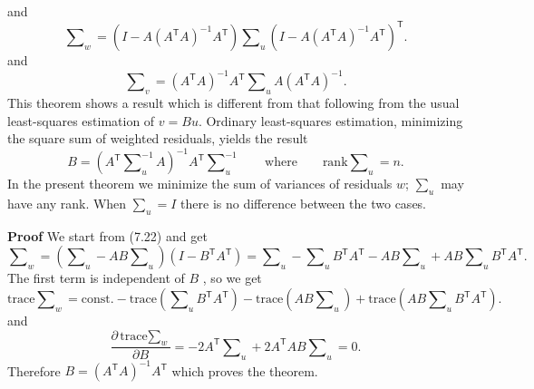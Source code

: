 and
\begin{equation}
\sum\nolimits_w
=(I - A(A^\mathsf{T}A)^{-1}A^\mathsf{T})\sum\nolimits_u(I - A(A^\mathsf{T}A)^{-1}A^\mathsf{T})^\mathsf{T}.
\end{equation}
and
\begin{equation}
\sum\nolimits_v
=(A^\mathsf{T}A)^{-1}A^\mathsf{T}\sum\nolimits_uA(A^\mathsf{T}A)^{-1}.
\end{equation}
This theorem shows a result which is different from that following from the usual
least-squares estimation of $v = Bu$. Ordinary least-squares estimation, minimizing the
square sum of weighted residuals, yields the result
\begin{equation*}
B = (A^\mathsf{T}\sum\nolimits_{u}^{-1}A)^{-1}A^\mathsf{T}\sum\nolimits_{u}^{-1} \qquad \text{where} \qquad \text{rank} \sum\nolimits_u = n.
\end{equation*}
In the present theorem we minimize the sum of variances of residuals $w$; $\sum_u$ may have any
rank. When $\sum_u = I$ there is no difference between the two cases.
\par\noindent
\textbf{Proof} We start from (7.22) and get
\begin{equation*}
\sum\nolimits_w = (\sum\nolimits_u - AB\sum\nolimits_u)(I - B^\mathsf{T}A^\mathsf{T})
= \sum\nolimits_u - \sum\nolimits_uB^\mathsf{T}A^\mathsf{T} - AB\sum\nolimits_u + AB\sum\nolimits_uB^\mathsf{T}A^\mathsf{T}.
\end{equation*}
The first term is independent of $B$ , so we get
\begin{equation*}
\text{trace} \sum\nolimits_w = \text{const}.
- \text{trace}(\sum\nolimits_uB^\mathsf{T}A^\mathsf{T})
- \text{trace}(AB\sum\nolimits_u)
+ \text{trace}(AB\sum\nolimits_uB^\mathsf{T}A^\mathsf{T}).
\end{equation*}
and
\begin{equation*}
\frac{\partial {\text{trace} \sum\nolimits_w}}{\partial{B}}
= -2A^\mathsf{T}\sum\nolimits_u + 2A^\mathsf{T}AB\sum\nolimits_u = 0.
\end{equation*}
Therefore $B = (A^\mathsf{T}A)^{-1}A^\mathsf{T}$ which proves the theorem.